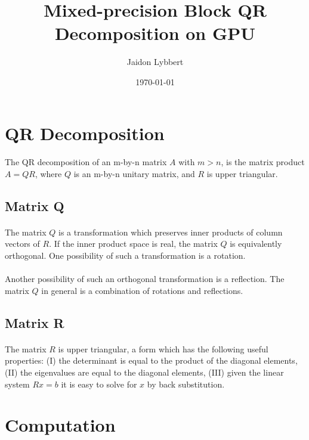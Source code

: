 \documentclass{article}
\title{Mixed-precision Block QR Decomposition on GPU}
\author{Jaidon Lybbert}
\date{\today{}}
\begin{document}
\maketitle{}
\tableofcontents{}

\section{QR Decomposition}
\paragraph{}
The QR decomposition of an m-by-n matrix $A$ with $m>n$, is the matrix product $A = QR$, where $Q$ is an 
m-by-n unitary matrix, and $R$ is upper triangular.

\subsection{Matrix Q}
\paragraph{}
The matrix $Q$ is a transformation which preserves inner products of column vectors of $R$. If the 
inner product space is real, the matrix $Q$ is equivalently orthogonal. One possibility of such a 
transformation is a rotation.
\paragraph{}
Another possibility of such an orthogonal transformation is a reflection. The matrix $Q$ in general 
is a combination of rotations and reflections.

\subsection{Matrix R}
\paragraph{}
The matrix $R$ is upper triangular, a form which has the following useful properties: (I) the determinant is equal to the product of the diagonal elements, (II) the eigenvalues are equal to the diagonal elements, (III) given the linear system $Rx = b$ it is easy to solve for $x$ by back substitution.

\section{Computation}
\end{document}
